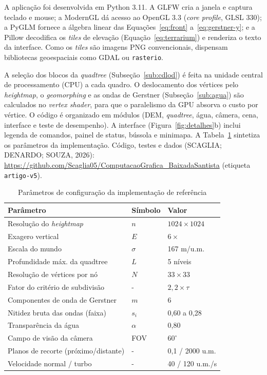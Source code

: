\documentclass[conference]{IEEEtran}
\newcommand{\fonte}[1]{\par\vspace{2pt}{\footnotesize Fonte: #1\par}}
\begin{document}
A aplicação foi desenvolvida em Python 3.11. A GLFW cria a janela e captura
teclado e mouse; a ModernGL dá acesso ao OpenGL 3.3 (\emph{core profile},
GLSL 330); a PyGLM fornece a álgebra linear das
Equações~\eqref{eq:front} a~\eqref{eq:gerstner-y}; e a Pillow decodifica os
\emph{tiles} de elevação (Equação~\eqref{eq:terrarium}) e renderiza o texto da
interface. Como os \emph{tiles} são imagens PNG convencionais, dispensam
bibliotecas geoespaciais como GDAL ou \texttt{rasterio}.

A seleção dos blocos da \emph{quadtree} (Subseção~\ref{sub:cdlod}) é feita
na unidade central de processamento (CPU) a cada quadro. O deslocamento dos
vértices pelo \emph{heightmap}, o \emph{geomorphing} e as ondas de Gerstner
(Subseção~\ref{sub:agua}) são calculados no \emph{vertex shader}, para que o
paralelismo da GPU absorva o custo por vértice. O código é organizado em
módulos (DEM, \emph{quadtree}, água, câmera, cena, interface e teste de
desempenho). A interface (Figura~\ref{fig:detalhes}b) inclui legenda de comandos, painel de status, bússola e minimapa. A
Tabela~\ref{tab:parametros} sintetiza os parâmetros da implementação. Código, testes e dados (SCAGLIA; DENARDO; SOUZA, 2026): \url{https://github.com/Scaglia05/ComputacaoGrafica_BaixadaSantista} (etiqueta \texttt{artigo-v5}).

\begin{table}[t]
\caption{Parâmetros de configuração da implementação de referência}
\label{tab:parametros}
\centering
\begin{tabular}{@{}p{3.1cm}p{0.9cm}p{2.4cm}@{}}
\toprule
\textbf{Parâmetro} & \textbf{Símbolo} & \textbf{Valor} \\
\midrule
Resolução do \emph{heightmap} & $n$ & $1024 \times 1024$ \\
Exagero vertical & $E$ & $6\times$ \\
Escala do mundo & $\sigma$ & 167 m/u.m. \\
Profundidade máx. da quadtree & $L$ & 5 níveis \\
Resolução de vértices por nó & $N$ & $33 \times 33$ \\
Fator do critério de subdivisão & - & $2{,}2 \times \tau$ \\
Componentes de onda de Gerstner & $m$ & 6 \\
Nitidez bruta das ondas (faixa) & $s_i$ & 0,60 a 0,28 \\
Transparência da água & $\alpha$ & 0,80 \\
Campo de visão da câmera & FOV & $60^{\circ}$ \\
Planos de recorte (próximo/distante) & - & 0,1 / 2000 u.m. \\
Velocidade normal / turbo & - & 40 / 120 u.m./s \\
\bottomrule
\end{tabular}
\fonte{Elaborado pelos autores (2026), com base no código-fonte da implementação.}
\end{table}
\end{document}
